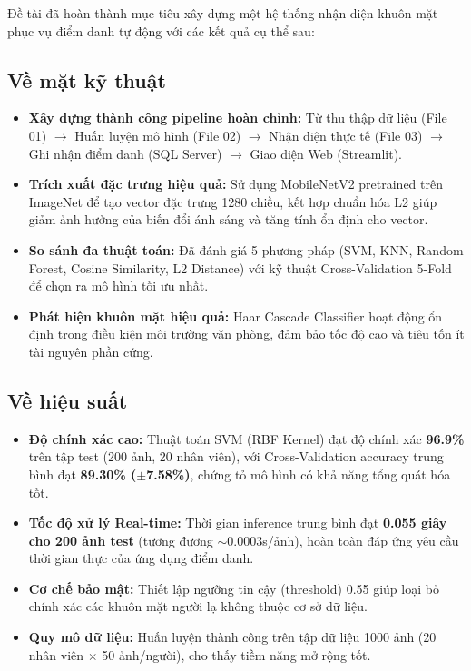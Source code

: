 \documentclass[a4paper]{book}
\begin{document}
Đề tài đã hoàn thành mục tiêu xây dựng một hệ thống nhận diện khuôn mặt phục vụ điểm danh tự động với các kết quả cụ thể sau:

\subsection*{Về mặt kỹ thuật}
\begin{itemize}
    \item \textbf{Xây dựng thành công pipeline hoàn chỉnh:} Từ thu thập dữ liệu (File 01) $\rightarrow$ Huấn luyện mô hình (File 02) $\rightarrow$ Nhận diện thực tế (File 03) $\rightarrow$ Ghi nhận điểm danh (SQL Server) $\rightarrow$ Giao diện Web (Streamlit).
    \item \textbf{Trích xuất đặc trưng hiệu quả:} Sử dụng MobileNetV2 pretrained trên ImageNet để tạo vector đặc trưng 1280 chiều, kết hợp chuẩn hóa L2 giúp giảm ảnh hưởng của biến đổi ánh sáng và tăng tính ổn định cho vector.
    \item \textbf{So sánh đa thuật toán:} Đã đánh giá 5 phương pháp (SVM, KNN, Random Forest, Cosine Similarity, L2 Distance) với kỹ thuật Cross-Validation 5-Fold để chọn ra mô hình tối ưu nhất.
    \item \textbf{Phát hiện khuôn mặt hiệu quả:} Haar Cascade Classifier hoạt động ổn định trong điều kiện môi trường văn phòng, đảm bảo tốc độ cao và tiêu tốn ít tài nguyên phần cứng.
\end{itemize}

\subsection*{Về hiệu suất}
\begin{itemize}
    \item \textbf{Độ chính xác cao:} Thuật toán SVM (RBF Kernel) đạt độ chính xác \textbf{96.9\%} trên tập test (200 ảnh, 20 nhân viên), với Cross-Validation accuracy trung bình đạt \textbf{89.30\% ($\pm$7.58\%)}, chứng tỏ mô hình có khả năng tổng quát hóa tốt.
    \item \textbf{Tốc độ xử lý Real-time:} Thời gian inference trung bình đạt \textbf{0.055 giây cho 200 ảnh test} (tương đương $\sim$0.0003s/ảnh), hoàn toàn đáp ứng yêu cầu thời gian thực của ứng dụng điểm danh.
    \item \textbf{Cơ chế bảo mật:} Thiết lập ngưỡng tin cậy (threshold) 0.55 giúp loại bỏ chính xác các khuôn mặt người lạ không thuộc cơ sở dữ liệu.
    \item \textbf{Quy mô dữ liệu:} Huấn luyện thành công trên tập dữ liệu 1000 ảnh (20 nhân viên $\times$ 50 ảnh/người), cho thấy tiềm năng mở rộng tốt.
\end{itemize}
\end{document}
